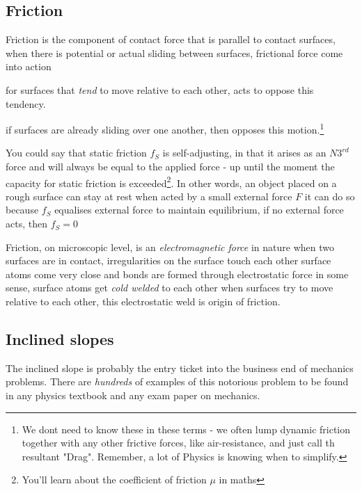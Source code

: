 \subsection{Friction}

Friction is the component of contact force that is parallel to contact surfaces, when there is potential or actual sliding between surfaces, frictional force come into action

\titem for surfaces that \emph{tend} to move relative to each other,  acts to oppose this tendency.

\titem if surfaces are already sliding over one another, then  opposes this motion.\footnote{\piste We dont need to know these in these terms - we often lump dynamic friction together with any other frictive forces, like air-resistance, and just call th resultant "Drag". Remember, a lot of Physics is knowing when to simplify.}

You could say that static friction $f_S$ is self-adjusting, in that it arises as an $N3^{rd}$ force and will always be equal to the applied force - up until the moment the capacity for static friction is exceeded\footnote{You'll learn about the coefficient of friction $\mu$ in maths}.
In other words, an object placed on a rough surface can stay at rest when acted by a small external force $F$ it can do so because $f_S$ equalises external force to maintain equilibrium, if no external force acts, then $f_S=0$

Friction, on microscopic level, is an \emph{electromagnetic force} in nature when two surfaces are in contact, irregularities on the surface touch each other surface atoms come very close and bonds are formed through electrostatic force in some sense, surface atoms get \emph{cold welded} to each other when surfaces try to move relative to each other, this electrostatic weld is origin of friction.

\subsection{Inclined slopes}

The inclined slope is probably the entry ticket into the business end of mechanics problems. There are \emph{hundreds} of examples of this notorious problem to be found in any physics textbook and any exam paper on mechanics.

